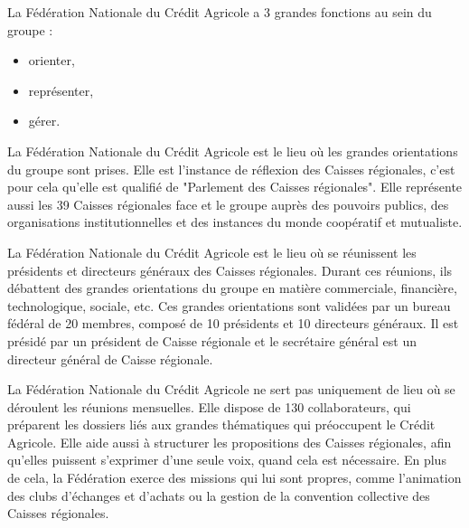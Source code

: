 \documentclass[12pt,a4paper]{article}
\begin{document}
La Fédération Nationale du Crédit Agricole a 3 grandes fonctions au sein du groupe : 
\begin{itemize}
\item orienter,
\item représenter,
\item gérer.
\end{itemize}
La Fédération Nationale du Crédit Agricole est le lieu où les grandes orientations du groupe sont prises. Elle est l'instance de réflexion des Caisses régionales, c'est pour cela qu'elle est qualifié de "Parlement des Caisses régionales". Elle représente aussi les 39 Caisses régionales face et le groupe auprès des pouvoirs publics, des organisations institutionnelles et des instances du monde coopératif et mutualiste.\par 
\bigskip
La Fédération Nationale du Crédit Agricole est le lieu où se réunissent les présidents et directeurs généraux des Caisses régionales. Durant ces réunions, ils débattent des grandes orientations du groupe en matière commerciale, financière, technologique, sociale, etc. Ces grandes orientations sont validées par un bureau fédéral de 20 membres, composé de 10 présidents et 10 directeurs généraux. Il est présidé par un président de Caisse régionale et le secrétaire général est un directeur général de Caisse régionale.\par 
\bigskip
La Fédération Nationale du Crédit Agricole ne sert pas uniquement de lieu où se déroulent les réunions mensuelles. Elle dispose de 130 collaborateurs, qui préparent les dossiers liés aux grandes thématiques qui préoccupent le Crédit Agricole. Elle aide aussi à structurer les propositions des Caisses régionales, afin qu'elles puissent s'exprimer d'une seule voix, quand cela est nécessaire. En plus de cela, la Fédération exerce des missions qui lui sont propres, comme l'animation des clubs d'échanges et d'achats ou la gestion de la convention collective des Caisses régionales.\par
\end{document}
